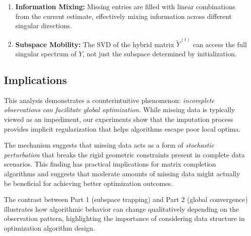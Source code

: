 \documentclass[11pt]{article}
\theoremstyle{spaced}
\begin{document}
\begin{enumerate}[itemsep=2pt]
\item \textbf{Information Mixing:} Missing entries are filled with linear combinations from the current estimate, effectively mixing information across different singular directions.

\item \textbf{Subspace Mobility:} The SVD of the hybrid matrix $\tilde{Y}^{(t)}$ can access the full singular spectrum of $Y$, not just the subspace determined by initialization.
\end{enumerate}

\subsection*{Implications}

This analysis demonstrates a counterintuitive phenomenon: \emph{incomplete observations can facilitate global optimization}. While missing data is typically viewed as an impediment, our experiments show that the imputation process provides implicit regularization that helps algorithms escape poor local optima.

The mechanism suggests that missing data acts as a form of \emph{stochastic perturbation} that breaks the rigid geometric constraints present in complete data scenarios. This finding has practical implications for matrix completion algorithms and suggests that moderate amounts of missing data might actually be beneficial for achieving better optimization outcomes.

The contrast between Part 1 (subspace trapping) and Part 2 (global convergence) illustrates how algorithmic behavior can change qualitatively depending on the observation pattern, highlighting the importance of considering data structure in optimization algorithm design.
\end{document}
